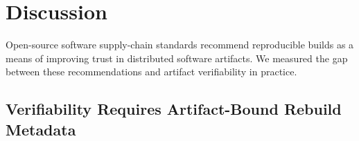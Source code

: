 








\section{Discussion}

Open-source software supply-chain standards recommend reproducible builds as a means of improving trust in distributed software artifacts.
We measured the gap between these recommendations and artifact verifiability in practice.

\subsection{Verifiability Requires Artifact-Bound Rebuild Metadata}
\label{subsec:discussion-verifiability-metadata}

